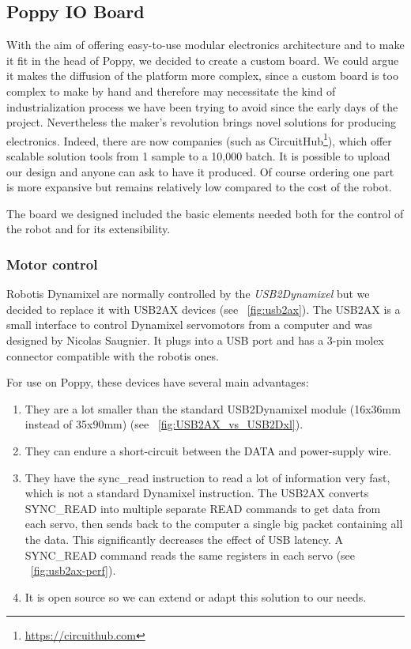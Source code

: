 \subsection{Poppy IO Board} %

With the aim of offering easy-to-use modular electronics architecture and to make it fit in the head of Poppy, we decided to create a custom board. We could argue it makes the diffusion of the platform more complex, since a custom board is too complex to make by hand and therefore may necessitate the kind of industrialization process we have been trying to avoid since the early days of the project. Nevertheless the maker’s revolution brings novel solutions for producing electronics. Indeed, there are now companies (such as CircuitHub\footnote{\url{https://circuithub.com}}), which offer scalable solution tools from 1 sample to a 10,000 batch. It is possible to upload our design and anyone can ask to have it produced. Of course ordering one part is more expansive but remains relatively low compared to the cost of the robot.

The board we designed included the basic elements needed both for the control of the robot and for its extensibility.


\subsubsection{Motor control} %
Robotis Dynamixel are normally controlled by the \emph{USB2Dynamixel} but we decided to replace it with USB2AX devices (see \figurename~\ref{fig:usb2ax}). The USB2AX is a small interface to control Dynamixel servomotors from a computer and was designed by Nicolas Saugnier. It plugs into a USB port and has a 3-pin molex connector compatible with the robotis ones.

For use on Poppy, these devices have several main advantages:
\begin{enumerate}
    \item They are a lot smaller than the standard USB2Dynamixel module (16x36mm instead of 35x90mm) (see \figurename~\ref{fig:USB2AX_vs_USB2Dxl}).
    \item They can endure a short-circuit between the DATA and power-supply wire.
    \item They have the sync\_read instruction to read a lot of information very fast, which is not a standard Dynamixel instruction. The USB2AX converts SYNC\_READ into multiple separate READ commands to get data from each servo, then sends back to the computer a single big packet containing all the data. This significantly decreases the effect of USB latency. A SYNC\_READ command reads the same registers in each servo (see \figurename~\ref{fig:usb2ax-perf}).
    \item It is open source so we can extend or adapt this solution to our needs.
\end{enumerate}

